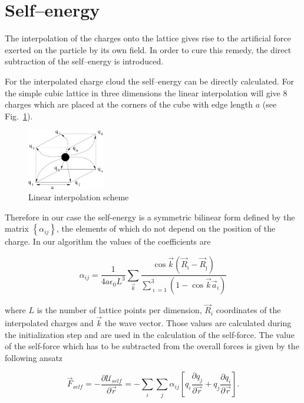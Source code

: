 \section{Self--energy}

The interpolation of the charges onto the lattice gives rise to the
artificial force exerted on the particle by its own field. In order to
cure this remedy, the direct subtraction of the self--energy is
introduced.

For the interpolated charge cloud the self--energy can be directly
calculated. For the simple cubic lattice in three dimensions the
linear interpolation will give 8 charges which are placed at the
corners of the cube with edge length $a$ (see
Fig.~\ref{fig:charge-assignment}).

\begin{figure}[ht]
  \centering
  \includegraphics[width=0.3\textwidth]{figures/maggs-charge-assignment}
  \caption{Linear interpolation scheme} 
  \label{fig:charge-assignment}  
\end{figure}

Therefore in our case the self-energy is a symmetric bilinear form
defined by the matrix $\left\{\alpha_{ij}\right\}$, the elements of
which do not depend on the position of the charge. In our algorithm
the values of the coefficients are

\begin{equation}
  \alpha_{ij}=\frac{1}{4a\epsilon_0L^3}\sum\limits_{\vec k}
  \frac{\cos \vec k(\vec R_{\imath}-\vec R_{\jmath})}
  {\sum_{\imath=1}^3(1-\cos\vec k\vec a_{\imath})}
\end{equation}

where $L$ is the number of lattice points per dimension, $\vec R_i$
coordinates of the interpolated charges and $\vec k$ the wave vector.
Those values are calculated during the initialization step and are
used in the calculation of the self-force. The value of the self-force
which has to be subtracted from the overall forces is given by the
following ansatz

\begin{equation}
  \vec F_{self}=-\frac{\partial \mathcal U_{self}}{\partial\vec r}
  =-\sum\limits_i\sum\limits_j\alpha_{ij}
  \left[q_i\frac{\partial q_j}{\partial\vec r}
    +q_j\frac{\partial q_i}{\partial\vec r}\right].
\end{equation}

